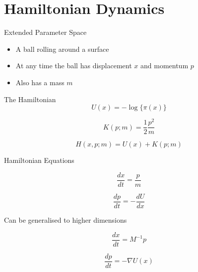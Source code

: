 \documentclass{beamer}
\begin{document}

\section{Hamiltonian Dynamics}


\begin{frame}{Extended Parameter Space}
\begin{itemize}
\item A ball rolling around a surface
\item At any time the ball has displacement $x$ and momentum $p$
\item Also has a mass $m$
\end{itemize}
\end{frame}
\begin{frame}{The Hamiltonian}
\begin{equation*}
U(x) = - \log \{\pi(x)\}
\end{equation*}

\begin{equation*}
K(p; m) = \frac{1}{2} \frac{p^2}{m}
\end{equation*}

\begin{equation*}
H(x, p; m) = U(x) + K(p;m)
\end{equation*}
\end{frame}

\begin{frame}{Hamiltonian Equations}

\begin{equation*}
\frac{dx}{dt} = \frac{p}{m}
\end{equation*}

\begin{equation*}
\frac{dp}{dt} = - \frac{dU}{dx}
\end{equation*}

Can be generalised to higher dimensions

\begin{equation*}
\frac{dx}{dt} = M^{-1}p
\end{equation*}

\begin{equation*}
\frac{dp}{dt} = - \nabla U(x)
\end{equation*}

\end{frame}
\end{document}
